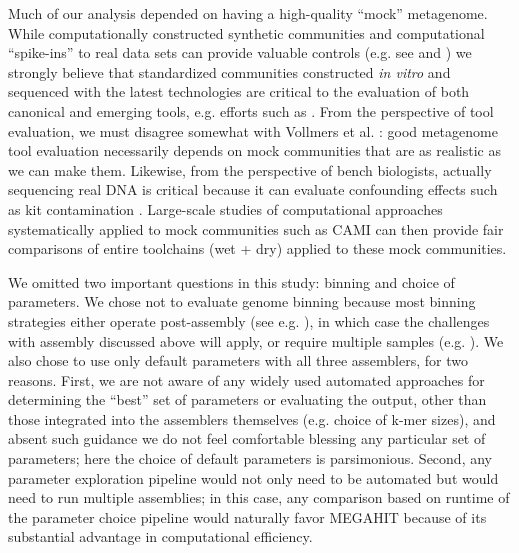 \documentclass[11pt]{article}
\begin{document}
Much of our analysis depended on having a high-quality ``mock''
metagenome.  While computationally constructed synthetic communities
and computational ``spike-ins'' to real data sets can provide valuable
controls (e.g. see \cite{metag_one} and \cite{ahowe2014}) we strongly
believe that standardized communities constructed {\em in vitro} and
sequenced with the latest technologies are critical to the evaluation
of both canonical and emerging tools, e.g. efforts such as
\cite{Brown2017}. From the perspective of tool evaluation, we must
disagree somewhat with Vollmers et al. \cite{Vollmers2017}: good
metagenome tool evaluation necessarily depends on mock communities
that are as realistic as we can make them.  Likewise, from the
perspective of bench biologists, actually sequencing real DNA is
critical because it can evaluate confounding effects such as kit
contamination \cite{Salter2014}.  Large-scale studies of computational
approaches systematically applied to mock communities such as CAMI
\cite{CAMI} can then provide fair comparisons of entire toolchains
(wet + dry) applied to these mock communities.


We omitted two important questions in this study: binning and choice
of parameters.  We chose not to evaluate genome binning because most
binning strategies either operate post-assembly (see
e.g. \cite{laczny2017busybee}), in which case the challenges with
assembly discussed above will apply, or require multiple samples
(e.g. \cite{Cleary2015}).  We also chose to use only default
parameters with all three assemblers, for two
reasons.  First, we are not aware of any widely used automated
approaches for determining the ``best'' set of parameters or
evaluating the output, other than those integrated into the assemblers
themselves (e.g. choice of k-mer sizes), and absent such guidance we
do not feel comfortable blessing any particular set of parameters; here the
choice of default parameters is parsimonious.  Second, any parameter
exploration pipeline would not only need to be automated but would
need to run multiple assemblies; in this case, any comparison based on
runtime of the parameter choice pipeline would naturally favor MEGAHIT
because of its substantial advantage in computational efficiency.


%
\end{document}
